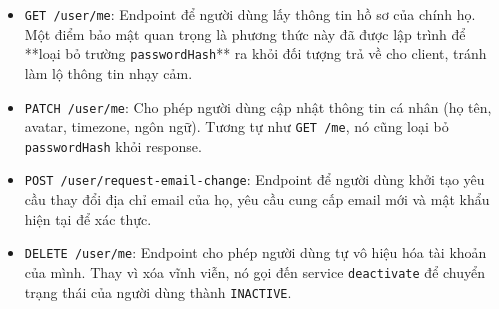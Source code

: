 \begin{itemize}
    \item \texttt{GET /user/me}: Endpoint để người dùng lấy thông tin hồ sơ của chính họ. Một điểm bảo mật quan trọng là phương thức này đã được lập trình để **loại bỏ trường \texttt{passwordHash}** ra khỏi đối tượng trả về cho client, tránh làm lộ thông tin nhạy cảm.
    
    \item \texttt{PATCH /user/me}: Cho phép người dùng cập nhật thông tin cá nhân (họ tên, avatar, timezone, ngôn ngữ). Tương tự như \texttt{GET /me}, nó cũng loại bỏ \texttt{passwordHash} khỏi response.
    
    \item \texttt{POST /user/request-email-change}: Endpoint để người dùng khởi tạo yêu cầu thay đổi địa chỉ email của họ, yêu cầu cung cấp email mới và mật khẩu hiện tại để xác thực.
    
    \item \texttt{DELETE /user/me}: Endpoint cho phép người dùng tự vô hiệu hóa tài khoản của mình. Thay vì xóa vĩnh viễn, nó gọi đến service \texttt{deactivate} để chuyển trạng thái của người dùng thành \texttt{INACTIVE}.
\end{itemize}